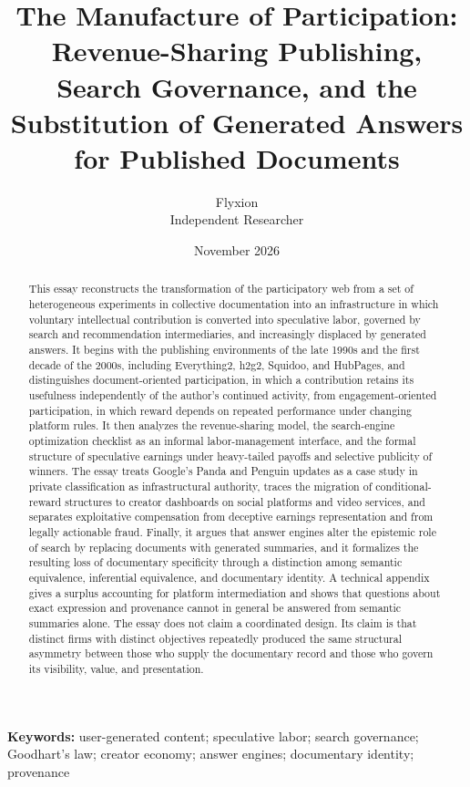 \documentclass[11pt]{article}
\title{The Manufacture of Participation:\\[0.4em]
\large Revenue-Sharing Publishing, Search Governance, and the Substitution of Generated Answers for Published Documents}
\author{Flyxion\\Independent Researcher}
\date{November 2026}
\theoremstyle{remark}
\begin{document}
\maketitle

\begin{abstract}
\noindent This essay reconstructs the transformation of the participatory web from a set of heterogeneous experiments in collective documentation into an infrastructure in which voluntary intellectual contribution is converted into speculative labor, governed by search and recommendation intermediaries, and increasingly displaced by generated answers. It begins with the publishing environments of the late 1990s and the first decade of the 2000s, including Everything2, h2g2, Squidoo, and HubPages, and distinguishes document-oriented participation, in which a contribution retains its usefulness independently of the author's continued activity, from engagement-oriented participation, in which reward depends on repeated performance under changing platform rules. It then analyzes the revenue-sharing model, the search-engine optimization checklist as an informal labor-management interface, and the formal structure of speculative earnings under heavy-tailed payoffs and selective publicity of winners. The essay treats Google's Panda and Penguin updates as a case study in private classification as infrastructural authority, traces the migration of conditional-reward structures to creator dashboards on social platforms and video services, and separates exploitative compensation from deceptive earnings representation and from legally actionable fraud. Finally, it argues that answer engines alter the epistemic role of search by replacing documents with generated summaries, and it formalizes the resulting loss of documentary specificity through a distinction among semantic equivalence, inferential equivalence, and documentary identity. A technical appendix gives a surplus accounting for platform intermediation and shows that questions about exact expression and provenance cannot in general be answered from semantic summaries alone. The essay does not claim a coordinated design. Its claim is that distinct firms with distinct objectives repeatedly produced the same structural asymmetry between those who supply the documentary record and those who govern its visibility, value, and presentation.
\end{abstract}

\vspace{1.5em}
\noindent\textbf{Keywords:} user-generated content; speculative labor; search governance; Goodhart's law; creator economy; answer engines; documentary identity; provenance
\end{document}
